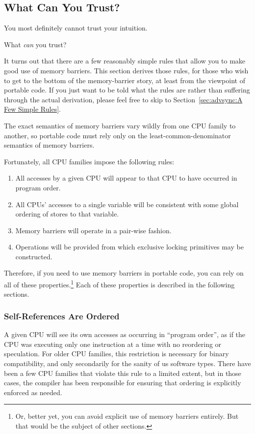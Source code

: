 \subsection{What Can You Trust?}
\label{sec:advsync:What Can You Trust?}

You most definitely cannot trust your intuition.

What \emph{can} you trust?

It turns out that there are a few reasonably simple rules that
allow you to make good use of memory barriers.
This section derives those rules, for those who wish to get
to the bottom of the memory-barrier story, at least from the viewpoint
of portable code.
If you just want to be told what the rules are rather than suffering
through the actual derivation,
please feel free to skip to Section~\ref{sec:advsync:A Few Simple Rules}.

The exact semantics of memory barriers vary wildly from one CPU family to
another, so portable code must rely only on the least-common-denominator
semantics of memory barriers.

Fortunately, all CPU families impose the following rules:
\begin{enumerate}
\item	All accesses by a given CPU will appear to that CPU to have
	occurred in program order.
\item	All CPUs' accesses to a single variable will be consistent with
	some global ordering of stores to that variable.
\item	Memory barriers will operate in a pair-wise fashion.
\item	Operations will be provided from which exclusive locking
	primitives may be constructed.
\end{enumerate}

Therefore, if you need to use memory barriers in portable code,
you can rely on all of these properties.\footnote{
	Or, better yet, you can avoid explicit use of memory barriers
	entirely.
	But that would be the subject of other sections.}
Each of these properties is described in the following sections.

\subsubsection{Self-References Are Ordered}

A given CPU will see its own accesses as occurring in ``program order'',
as if the CPU was executing only one instruction at a time with no
reordering or speculation.
For older CPU families, this restriction is necessary for binary compatibility,
and only secondarily for the sanity of us software types.
There have been a few CPU families that violate this rule to a limited extent,
but in those cases, the compiler has been responsible
for ensuring that ordering is explicitly enforced as needed.

